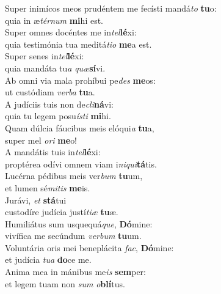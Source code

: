 \evenverse Super inimícos meos prudéntem me fecísti mandá\textit{to} \textbf{tu}o:~\*\\
\evenverse quia in æ\textit{tér}\textit{num} \textbf{mi}hi est.\\
\oddverse Super omnes docéntes me in\textit{tel}\textbf{lé}xi:~\*\\
\oddverse quia testimónia tua meditá\textit{ti}\textit{o} \textbf{me}a est.\\
\evenverse Super senes in\textit{tel}\textbf{lé}xi:~\*\\
\evenverse quia mandáta tu\textit{a} \textit{quæ}\textbf{sí}vi.\\
\oddverse Ab omni via mala prohíbui pe\textit{des} \textbf{me}os:~\*\\
\oddverse ut custódiam \textit{ver}\textit{ba} \textbf{tu}a.\\
\evenverse A judíciis tuis non de\textit{cli}\textbf{ná}vi:~\*\\
\evenverse quia tu legem posu\textit{í}\textit{sti} \textbf{mi}hi.\\
\oddverse Quam dúlcia fáucibus meis elóqui\textit{a} \textbf{tu}a,~\*\\
\oddverse super mel \textit{o}\textit{ri} \textbf{me}o!\\
\evenverse A mandátis tuis in\textit{tel}\textbf{lé}xi:~\*\\
\evenverse proptérea odívi omnem viam i\textit{ni}\textit{qui}\textbf{tá}tis.\\
\oddverse Lucérna pédibus meis ver\textit{bum} \textbf{tu}um,~\*\\
\oddverse et lumen sé\textit{mi}\textit{tis} \textbf{me}is.\\
\evenverse Jurávi, \textit{et} \textbf{stá}tui~\*\\
\evenverse custodíre judícia justí\textit{ti}\textit{æ} \textbf{tu}æ.\\
\oddverse Humiliátus sum usquequá\textit{que}, \textbf{Dó}mine:~\*\\
\oddverse vivífica me secúndum \textit{ver}\textit{bum} \textbf{tu}um.\\
\evenverse Voluntária oris mei beneplácita \textit{fac}, \textbf{Dó}mine:~\*\\
\evenverse et judícia \textit{tu}\textit{a} \textbf{do}ce me.\\
\oddverse Anima mea in mánibus me\textit{is} \textbf{sem}per:~\*\\
\oddverse et legem tuam non \textit{sum} \textit{o}\textbf{blí}tus.\\
